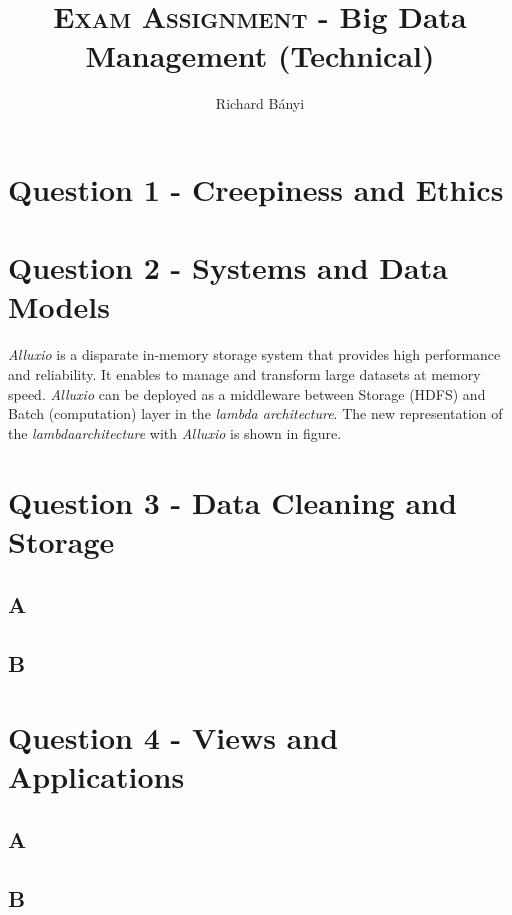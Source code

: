 \documentclass[format=acmsmall, review=false, screen=true]{acmart}
\author{Richard Bányi}
\title{\textsc{Exam Assignment} - Big Data Management (Technical) }
\begin{document}
\maketitle 

\section{Question 1 - Creepiness and Ethics }


\section{Question 2 - Systems and Data Models }

\textit{Alluxio} is a disparate in-memory storage system that provides high performance and reliability. It enables to manage and transform large datasets at memory speed. \textit{Alluxio} can be deployed as a middleware between Storage (HDFS) and Batch (computation) layer in the \textit{lambda architecture}. The new representation of the \textit{lambdaarchitecture} with \textit{Alluxio} is shown in figure.



\section{Question 3 - Data Cleaning and Storage }

\subsection{A}

\subsection{B}


\section{Question 4 - Views and Applications }

\subsection{A}

\subsection{B}
\end{document}
